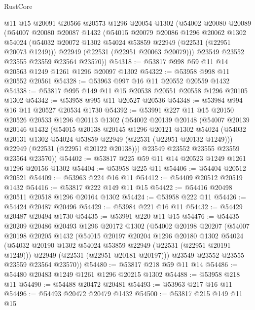 \begin{lexlean}{RustCore}
\begin{coremodule}
    @11
    @15
    @20091
    @20566
    @20573
    @1296
    @20054
    @1302
    (@54002
      @20080
      @20089
      (@54007
        @20080
        @20087
        @1432
        (@54015
          @20079
          @20086
          @1296
          @20062
          @1302
          @54024
          (@54032 @20072 @1302 @54024 @53859 @22949 (@22531 (@22951 @20073 @1249)))
          @22949
          (@22531 (@22951 @20063 @20079)))
        @23549
        @23552
        @23555
        @23559
        @23564
        @23570))
@54318 := @53817 @998 @59 @11 @14 @20563 @1249 @1261 @1296 @20097 @1302
@54322 := @53958 @998 @11 @20552 @20561
@54328 := @53963 @997 @16 @11 @20552 @20559 @1432
@54338 := @53817 @995 @149 @11 @15 @20538 @20551 @20558 @1296 @20105 @1302
@54342 := @53958 @995 @11 @20527 @20536
@54348 := @53984 @994 @16 @11 @20527 @20534 @1730
@54392 := @53991
    @227
    @11
    @15
    @20150
    @20526
    @20533
    @1296
    @20113
    @1302
    (@54002
      @20139
      @20148
      (@54007
        @20139
        @20146
        @1432
        (@54015
          @20138
          @20145
          @1296
          @20121
          @1302
          @54024
          (@54032 @20131 @1302 @54024 @53859 @22949 (@22531 (@22951 @20132 @1249)))
          @22949
          (@22531 (@22951 @20122 @20138)))
        @23549
        @23552
        @23555
        @23559
        @23564
        @23570))
@54402 := @53817 @225 @59 @11 @14 @20523 @1249 @1261 @1296 @20156 @1302
@54404 := @53958 @225 @11
@54406 := @54404 @20512 @20521
@54409 := @53963 @224 @16 @11
@54412 := @54409 @20512 @20519 @1432
@54416 := @53817 @222 @149 @11 @15
@54422 := @54416 @20498 @20511 @20518 @1296 @20164 @1302
@54424 := @53958 @222 @11
@54426 := @54424 @20487 @20496
@54429 := @53984 @221 @16 @11
@54432 := @54429 @20487 @20494 @1730
@54435 := @53991 @220 @11 @15
@54476 := @54435
    @20209
    @20486
    @20493
    @1296
    @20172
    @1302
    (@54002
      @20198
      @20207
      (@54007
        @20198
        @20205
        @1432
        (@54015
          @20197
          @20204
          @1296
          @20180
          @1302
          @54024
          (@54032 @20190 @1302 @54024 @53859 @22949 (@22531 (@22951 @20191 @1249)))
          @22949
          (@22531 (@22951 @20181 @20197)))
        @23549
        @23552
        @23555
        @23559
        @23564
        @23570))
@54480 := @53817 @218 @59 @11 @14
@54486 := @54480 @20483 @1249 @1261 @1296 @20215 @1302
@54488 := @53958 @218 @11
@54490 := @54488 @20472 @20481
@54493 := @53963 @217 @16 @11
@54496 := @54493 @20472 @20479 @1432
@54500 := @53817 @215 @149 @11 @15

\end{coremodule}
\end{lexlean}
